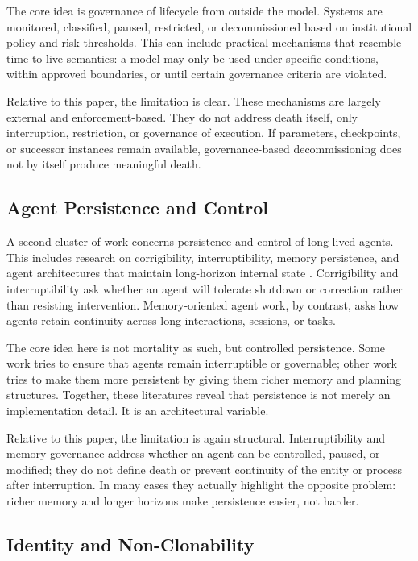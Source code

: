 \documentclass[11pt]{article}
\begin{document}
The core idea is governance of lifecycle from outside the model. Systems are monitored, classified, paused, restricted, or decommissioned based on institutional policy and risk thresholds. This can include practical mechanisms that resemble time-to-live semantics: a model may only be used under specific conditions, within approved boundaries, or until certain governance criteria are violated.

Relative to this paper, the limitation is clear. These mechanisms are largely external and enforcement-based. They do not address death itself, only interruption, restriction, or governance of execution. If parameters, checkpoints, or successor instances remain available, governance-based decommissioning does not by itself produce meaningful death.

\subsection{Agent Persistence and Control}

A second cluster of work concerns persistence and control of long-lived agents. This includes research on corrigibility, interruptibility, memory persistence, and agent architectures that maintain long-horizon internal state \cite{corrigibility,safely-interruptible,generative-agents,memgpt}. Corrigibility and interruptibility ask whether an agent will tolerate shutdown or correction rather than resisting intervention. Memory-oriented agent work, by contrast, asks how agents retain continuity across long interactions, sessions, or tasks.

The core idea here is not mortality as such, but controlled persistence. Some work tries to ensure that agents remain interruptible or governable; other work tries to make them more persistent by giving them richer memory and planning structures. Together, these literatures reveal that persistence is not merely an implementation detail. It is an architectural variable.

Relative to this paper, the limitation is again structural. Interruptibility and memory governance address whether an agent can be controlled, paused, or modified; they do not define death or prevent continuity of the entity or process after interruption. In many cases they actually highlight the opposite problem: richer memory and longer horizons make persistence easier, not harder.

\subsection{Identity and Non-Clonability}
\end{document}

